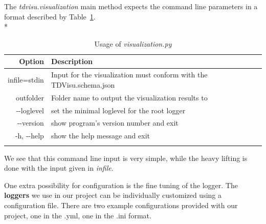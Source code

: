 \documentclass[a4paper, 12pt, bibliography=totoc]{scrartcl}
\begin{document}
The \textit{tdvisu.visualization} main method expects the command line parameters in a format described by Table~\ref{tab:optionstdvisu}.\\*
\begin{longtable}{|r|p{10cm}|}
	\hline
	Option & Description\\
	\hline\hline
	\endhead

	infile=stdin &  \looseness=-1 Input for the visualization must conform with the TDVisu.schema.json\\
	outfolder &  Folder name to output the visualization results to\\
	-{}-loglevel  & set the minimal loglevel for the root logger\\
	-{}-version & show program's version number and exit\\
	-h, -{}-help & show the help message and exit\\
	\hline\hline
	\caption{Usage of \textit{visualization.py}
		\label{tab:optionstdvisu}}
\end{longtable}\nopagebreak

We see that this command line input is very simple, while the heavy lifting is done with the input given in \textit{infile}.

One extra possibility for configuration is the fine tuning of the logger.
The \textbf{loggers} we use in our project 
can be individually customized using a configuration file.
There are two example configurations provided with our project, one in the .yml, one in the .ini format. 

%
\end{document}
